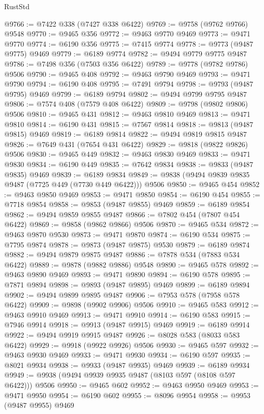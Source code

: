 \begin{lexlean}{RustStd}
\begin{coremodule}
@9766 := @7422 @338 (@7427 @338 @6422)
@9769 := @9758 (@9762 @9766) @9548
@9770 := @9465 @356
@9772 := @9463 @9770 @9469
@9773 := @9471 @9770
@9774 := @6190 @356
@9775 := @7415 @9774
@9778 := @9773 (@9487 @9775) @9469
@9779 := @6189 @9774
@9782 := @9494 @9779 @9775 @9487
@9786 := @7498 @356 (@7503 @356 @6422)
@9789 := @9778 (@9782 @9786) @9506
@9790 := @9465 @408
@9792 := @9463 @9790 @9469
@9793 := @9471 @9790
@9794 := @6190 @408
@9795 := @7491 @9794
@9798 := @9793 (@9487 @9795) @9469
@9799 := @6189 @9794
@9802 := @9494 @9799 @9795 @9487
@9806 := @7574 @408 (@7579 @408 @6422)
@9809 := @9798 (@9802 @9806) @9506
@9810 := @9465 @431
@9812 := @9463 @9810 @9469
@9813 := @9471 @9810
@9814 := @6190 @431
@9815 := @7567 @9814
@9818 := @9813 (@9487 @9815) @9469
@9819 := @6189 @9814
@9822 := @9494 @9819 @9815 @9487
@9826 := @7649 @431 (@7654 @431 @6422)
@9829 := @9818 (@9822 @9826) @9506
@9830 := @9465 @449
@9832 := @9463 @9830 @9469
@9833 := @9471 @9830
@9834 := @6190 @449
@9835 := @7642 @9834
@9838 := @9833 (@9487 @9835) @9469
@9839 := @6189 @9834
@9849 := @9838 (@9494 @9839 @9835 @9487 (@7725 @449 (@7730 @449 @6422))) @9506
@9850 := @9465 @454
@9852 := @9463 @9850 @9469
@9853 := @9471 @9850
@9854 := @6190 @454
@9855 := @7718 @9854
@9858 := @9853 (@9487 @9855) @9469
@9859 := @6189 @9854
@9862 := @9494 @9859 @9855 @9487
@9866 := @7802 @454 (@7807 @454 @6422)
@9869 := @9858 (@9862 @9866) @9506
@9870 := @9465 @534
@9872 := @9463 @9870 @9530
@9873 := @9471 @9870
@9874 := @6190 @534
@9875 := @7795 @9874
@9878 := @9873 (@9487 @9875) @9530
@9879 := @6189 @9874
@9882 := @9494 @9879 @9875 @9487
@9886 := @7878 @534 (@7883 @534 @6422)
@9889 := @9878 (@9882 @9886) @9548
@9890 := @9465 @578
@9892 := @9463 @9890 @9469
@9893 := @9471 @9890
@9894 := @6190 @578
@9895 := @7871 @9894
@9898 := @9893 (@9487 @9895) @9469
@9899 := @6189 @9894
@9902 := @9494 @9899 @9895 @9487
@9906 := @7953 @578 (@7958 @578 @6422)
@9909 := @9898 (@9902 @9906) @9506
@9910 := @9465 @583
@9912 := @9463 @9910 @9469
@9913 := @9471 @9910
@9914 := @6190 @583
@9915 := @7946 @9914
@9918 := @9913 (@9487 @9915) @9469
@9919 := @6189 @9914
@9922 := @9494 @9919 @9915 @9487
@9926 := @8028 @583 (@8033 @583 @6422)
@9929 := @9918 (@9922 @9926) @9506
@9930 := @9465 @597
@9932 := @9463 @9930 @9469
@9933 := @9471 @9930
@9934 := @6190 @597
@9935 := @8021 @9934
@9938 := @9933 (@9487 @9935) @9469
@9939 := @6189 @9934
@9949 := @9938 (@9494 @9939 @9935 @9487 (@8103 @597 (@8108 @597 @6422))) @9506
@9950 := @9465 @602
@9952 := @9463 @9950 @9469
@9953 := @9471 @9950
@9954 := @6190 @602
@9955 := @8096 @9954
@9958 := @9953 (@9487 @9955) @9469

\end{coremodule}
\end{lexlean}
